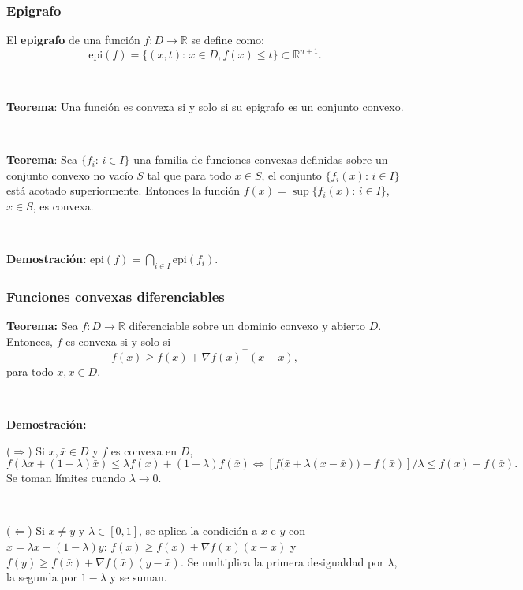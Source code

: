 \documentclass{beamer}
\begin{document}
\begin{frame}
\frametitle{Epigrafo}

El \textbf{epigrafo}  de una función $f:D \to\mathbb{R}$ se define como:
\[
\mbox{epi}(f) = \{(x,t):\, x\in D, f(x)\leq t\}\subset \mathbb{R}^{n+1}.
\]

\

\textbf{Teorema}: Una función es convexa  si y solo si su epigrafo  es un conjunto convexo. 

\

\textbf{Teorema}: Sea $\{f_i:\, i\in I\}$ una familia de funciones convexas definidas sobre un conjunto convexo no vacío $S$ tal que para todo $x\in S$, el conjunto $\{f_i(x):\, i\in I\}$ está acotado superiormente. Entonces la función $
f(x) = \sup\{f_i(x):\, i\in I\}$, $x\in S$, es convexa.

\

{\scriptsize
\textbf{Demostración:} $\mbox{epi}(f) = \bigcap_{i\in I}\mbox{epi}(f_i)$.
}


\end{frame}
\begin{frame}
\frametitle{Funciones convexas diferenciables}



\textbf{Teorema:} Sea $f:D\to\mathbb{R}$  diferenciable sobre un dominio convexo y abierto $D$. Entonces, $f$ es convexa si y solo si
\[
f(x)\geq f(\bar{x})+\nabla f(\bar{x})^\top (x-\bar{x}),
\]
para todo $x,\bar{x}\in D$.

\

{\scriptsize
\textbf{Demostración:}

($\Rightarrow$) Si $x,\bar{x}\in D$ y $f$ es convexa en $D$,
\[
f(\lambda x + (1-\lambda) \bar{x}) \leq \lambda f(x) + (1-\lambda) f(\bar{x}) \Leftrightarrow [f\big(\bar{x}+\lambda(x-\bar{x})\big) - f(\bar{x})] / \lambda \leq f(x) - f(\bar{x}).
\]
Se toman límites cuando $\lambda\to 0$.

\

($\Leftarrow$)  Si $x\neq y$ y $\lambda\in [0,1]$, se aplica la condición a $x$ e $y$ con $\bar{x}=\lambda x+(1-\lambda)y$:
$f(x)\geq f(\bar{x})+\nabla f(\bar{x})(x-\bar{x})$ y $f(y)\geq f(\bar{x})+\nabla f(\bar{x})(y-\bar{x})$. Se multiplica la primera desigualdad por $\lambda$, la segunda por $1-\lambda$ y se suman.


}


\end{frame}
\end{document}
